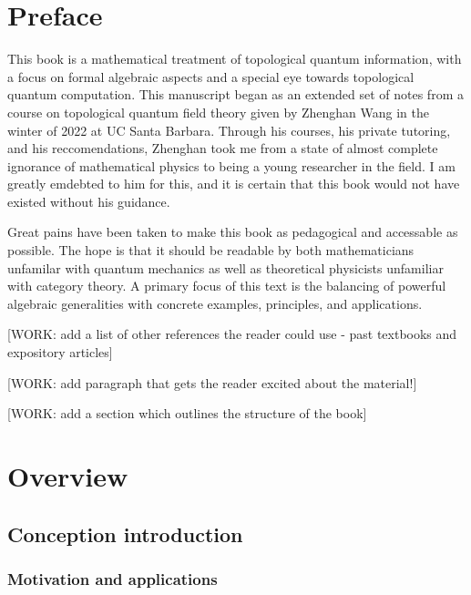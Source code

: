 \documentclass{article}
\theoremstyle{definition}
\numberwithin{figure}{section}
\begin{document}
\newpage

\tableofcontents

\newpage


\section{Preface}
\label{Preface}


This book is a mathematical treatment of topological quantum information, with a focus on formal algebraic aspects and a special eye towards topological quantum computation. This manuscript began as an extended set of notes from a course on topological quantum field theory given by Zhenghan Wang in the winter of 2022 at UC Santa Barbara. Through his courses, his private tutoring, and his reccomendations, Zhenghan took me from a state of almost complete ignorance of mathematical physics to being a young researcher in the field. I am greatly emdebted to him for this, and it is certain that this book would not have existed without his guidance.

Great pains have been taken to make this book as pedagogical and accessable as possible. The hope is that it should be readable by both mathematicians unfamilar with quantum mechanics as well as theoretical physicists unfamiliar with category theory. A primary focus of this text is the balancing of powerful algebraic generalities with concrete examples, principles, and applications.

[WORK: add a list of other references the reader could use - past textbooks and expository articles]

[WORK: add paragraph that gets the reader excited about the material!]

[WORK: add a section which outlines the structure of the book]

\newpage

\section{Overview}
\label{overview}

\subsection{Conception introduction}

\subsubsection{Motivation and applications}
\end{document}
